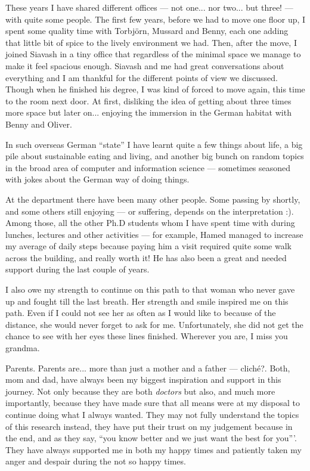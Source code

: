 These years I have shared different offices --- not one... nor two... but three! 
--- with quite some people. The first few years, before we had to move one floor 
up, I spent some quality time with Torbj\"{o}rn, Mussard and Benny, each one adding 
that little bit of spice to the lively environment we had. Then, after the move, 
I joined Siavash in a tiny office that regardless of the minimal space we manage 
to make it feel spacious enough. Siavash and me had great conversations about everything 
and I am thankful for the different points of view we discussed. Though when he 
finished his degree, I was kind of forced to move again, this time to the room next 
door. At first, disliking the idea of getting about three times more space but later 
on... enjoying the immersion in the German habitat with Benny and Oliver.

In such overseas German ``state'' I have learnt quite a few things about life, a 
big pile about sustainable eating and living, and another big bunch on random topics 
in the broad area of computer and information science --- sometimes seasoned with 
jokes about the German way of doing things.

At the department there have been many other people. Some passing by shortly, and 
some others still enjoying --- or suffering, depends on the interpretation :). Among 
those, all the other Ph.D students whom I have spent time with during lunches, lectures 
and other activities --- for example, Hamed managed to increase my average of daily 
steps because paying him a visit required quite some walk across the building, and 
really worth it! He has also been a great and needed support during the last couple 
of years.

I also owe my strength to continue on this path to that woman who never gave up 
and fought till the last breath. Her strength and smile inspired me on this path.
Even if I could not see her as often as I would like to because of the distance, she 
would never forget to ask for me. Unfortunately, she did not get the chance to see 
with her eyes these lines finished. Wherever you are, I miss you grandma.

Parents. Parents are... more than just a mother and a father --- cliché?. Both, 
mom and dad, have always been my biggest inspiration and support in this journey. 
Not only because they are both \emph{doctors} but also, and much more importantly, 
because they have made sure that all means were at my disposal to continue doing 
what I always wanted. They may not fully understand the topics of this research instead, 
they have put their trust on my judgement because in the end, and as they say, ``you 
know better and we just want the best for you'''. They have always supported me 
in both my happy times and patiently taken my anger and despair during the not so 
happy times.

